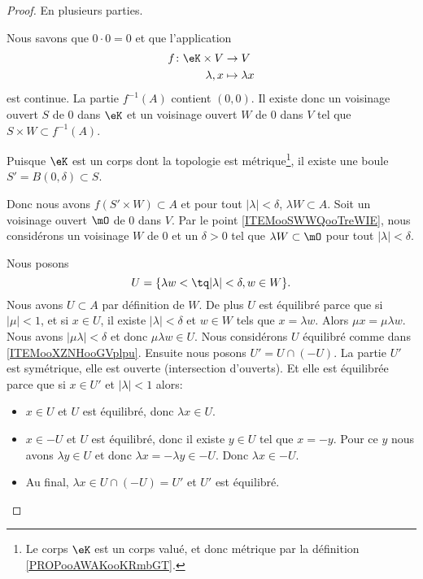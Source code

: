 \begin{proof}
	En plusieurs parties.
	\begin{subproof}
		Nous savons que \( 0\cdot 0=0\) et que l'application
		\begin{equation}
			\begin{aligned}
				f\colon \eK\times V & \to V             \\
				\lambda,x           & \mapsto \lambda x
			\end{aligned}
		\end{equation}
		est continue. La partie \( f^{-1}(A)\) contient \( (0,0)\). Il existe donc un voisinage ouvert \( S\) de \( 0\) dans \( \eK\) et un voisinage ouvert \( W\) de \( 0\) dans \( V\) tel que \( S\times W\subset f^{-1}(A)\).

		Puisque \( \eK\) est un corps dont la topologie est métrique\footnote{Le corps \( \eK\) est un corps valué, et donc métrique par la définition \ref{PROPooAWAKooKRmbGT}.}, il existe une boule \( S'=B(0,\delta)\subset S\).

		Donc nous avons \( f(S'\times W)\subset A \) et pour tout \( | \lambda |<\delta\), \( \lambda W\subset A\).
		Soit un voisinage ouvert \( \mO\) de \( 0\) dans \( V\). Par le point \ref{ITEMooSWWQooTreWIE}, nous considérons un voisinage \( W\) de \( 0\) et un \( \delta>0\) tel que \( \lambda W\subset\mO\) pour tout \( | \lambda |<\delta\).

		Nous posons
		\begin{equation}
			U=\{\lambda w<\tq | \lambda |<\delta, w\in W\}.
		\end{equation}
		Nous avons \( U\subset A\) par définition de \( W\). De plus \( U\) est équilibré parce que si \( | \mu |<1\), et si \( x\in U\), il existe \( | \lambda |<\delta\) et \( w\in W\) tels que \( x=\lambda w\). Alors \( \mu x=\mu\lambda w\). Nous avons \( | \mu\lambda |<\delta\) et donc \( \mu\lambda w\in U\).
		Nous considérons \( U\) équilibré comme dans \ref{ITEMooXZNHooGVplpu}. Ensuite nous posons \( U'=U\cap (-U)\). La partie \( U'\) est symétrique, elle est ouverte (intersection d'ouverts). Et elle est équilibrée parce que si \( x\in U'\) et \( | \lambda |<1\) alors:
		\begin{itemize}
			\item \( x\in U\) et \( U\) est équilibré, donc \( \lambda x\in U\).
			\item \( x\in -U\) et \( U\) est équilibré, donc il existe \( y\in U\) tel que \( x=-y\). Pour ce \( y\) nous avons \( \lambda y\in U\) et donc \( \lambda x=-\lambda y\in -U\). Donc \( \lambda x\in -U\).
			\item Au final, \( \lambda x\in U\cap (-U)=U'\) et \( U'\) est équilibré.
		\end{itemize}
	\end{subproof}
\end{proof}


